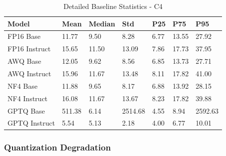 \documentclass[11pt,a4paper]{article}
\begin{document}
\begin{table}[H]
\centering
\caption{Detailed Baseline Statistics - C4}
\small
\begin{tabularx}{\textwidth}{@{}X C{1.5cm} C{1.5cm} C{1.5cm} C{1.5cm} C{1.5cm} C{1.5cm}@{}}
\toprule
\textbf{Model} & \textbf{Mean} & \textbf{Median} & \textbf{Std} & \textbf{P25} & \textbf{P75} & \textbf{P95} \\
\midrule
FP16 Base & 11.77 & 9.50 & 8.28 & 6.77 & 13.55 & 27.92 \\
FP16 Instruct & 15.65 & 11.50 & 13.09 & 7.86 & 17.73 & 37.95 \\
AWQ Base & 12.05 & 9.62 & 8.56 & 6.85 & 13.73 & 27.71 \\
AWQ Instruct & 15.96 & 11.67 & 13.48 & 8.11 & 17.82 & 41.00 \\
NF4 Base & 11.88 & 9.65 & 8.17 & 6.88 & 13.92 & 28.15 \\
NF4 Instruct & 16.08 & 11.67 & 13.67 & 8.23 & 17.82 & 39.88 \\
GPTQ Base & 511.38 & 6.14 & 2514.68 & 4.55 & 8.94 & 2592.63 \\
GPTQ Instruct & 5.54 & 5.13 & 2.18 & 4.00 & 6.77 & 10.01 \\
\bottomrule
\end{tabularx}
\end{table}

\subsubsection{Quantization Degradation}
\end{document}
